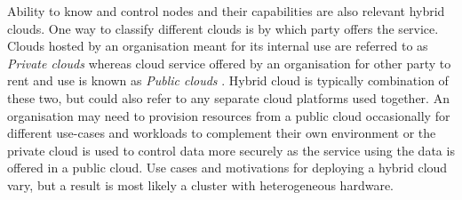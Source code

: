 Ability to know and control nodes and their capabilities are also relevant hybrid clouds. One way to classify different clouds is by which party offers the service. Clouds hosted by an organisation meant for its internal use are referred to as \textit{Private clouds} whereas cloud service offered by an organisation for other party to rent and use is known as \textit{Public clouds} \cite{cloudcomputingconcepts}. Hybrid cloud is typically combination of these two, but could also refer to any separate cloud platforms used together. An organisation may need to provision resources from a public cloud occasionally for different use-cases and workloads to complement their own environment or the private cloud is used to control data more securely as the service using the data is offered in a public cloud. Use cases and motivations for deploying a hybrid cloud vary, but a result is most likely a cluster with heterogeneous hardware.


	
